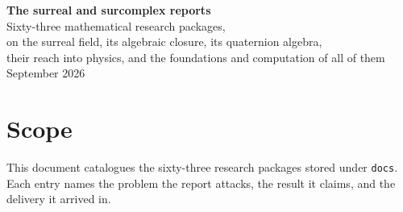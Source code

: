 \documentclass[11pt]{article}
\newcommand{\dir}[1]{\texttt{#1}}
\begin{document}
\begin{center}
 {\LARGE\bfseries\color{Ink} The surreal and surcomplex reports}\\[8pt]
 {\large Sixty-three mathematical research packages,\\
 on the surreal field, its algebraic closure, its quaternion algebra,\\
 their reach into physics, and the foundations and computation of all of them}\\[10pt]
 {\small September 2026}
\end{center}

\vspace{4pt}

\section*{Scope}

This document catalogues the sixty-three research packages stored under
\dir{docs}.  Each entry names the problem the report attacks, the result it
claims, and the delivery it arrived in.
\end{document}
